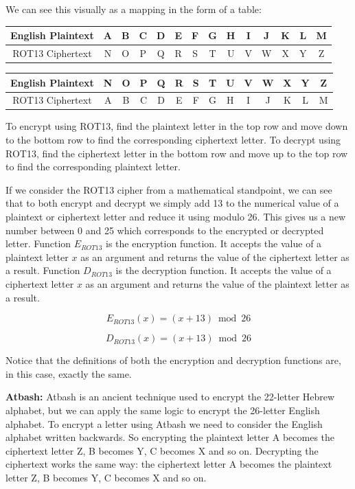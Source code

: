 We can see this visually as a mapping in the form of a table:

\Large
\begin{center}
  \begin{tabular}{|c|c|c|c|c|c|c|c|c|c|c|c|c|c|}
  \hline
    English Plaintext & A & B & C & D & E & F & G & H & I & J & K & L & M \\ \hline
	ROT13 Ciphertext & N & O & P & Q & R & S & T & U & V & W & X & Y & Z \\ \hline
  \end{tabular}
\end{center}

\begin{center}
  \begin{tabular}{|c|c|c|c|c|c|c|c|c|c|c|c|c|c|}
  \hline
    English Plaintext & N & O & P & Q & R & S & T & U & V & W & X & Y & Z \\ \hline
	ROT13 Ciphertext & A & B & C & D & E & F & G & H & I & J & K & L & M \\ \hline
  \end{tabular}
\end{center}

\normalsize

To encrypt using ROT13, find the plaintext letter in the top row and move down to the bottom row to find the corresponding ciphertext letter. To decrypt using ROT13, find the ciphertext letter in the bottom row and move up to the top row to find the corresponding plaintext letter.

If we consider the ROT13 cipher from a mathematical standpoint, we can see that to both encrypt and decrypt we simply add 13 to the numerical value of a plaintext or ciphertext letter and reduce it using modulo 26. This gives us a new number between 0 and 25 which corresponds to the encrypted or decrypted letter. Function $E_{ROT13}$ is the encryption function. It accepts the value of a plaintext letter $x$ as an argument and returns the value of the ciphertext letter as a result. Function $D_{ROT13}$ is the decryption function. It accepts the value of a ciphertext letter $x$ as an argument and returns the value of the plaintext letter as a result. 

\[
  E_{ROT13}(x) = (x + 13) \bmod 26
\]

\[
  D_{ROT13}(x) = (x + 13) \bmod 26
\]

Notice that the definitions of both the encryption and decryption functions are, in this case, exactly the same. 

{\bf Atbash:} Atbash is an ancient technique used to encrypt the 22-letter Hebrew alphabet, but we can apply the same logic to encrypt the 26-letter English alphabet. To encrypt a letter using Atbash we need to consider the English alphabet written backwards. So encrypting the plaintext letter A becomes the ciphertext letter Z, B becomes Y, C becomes X and so on. Decrypting the ciphertext works the same way: the ciphertext letter A becomes the plaintext letter Z, B becomes Y, C becomes X and so on.

